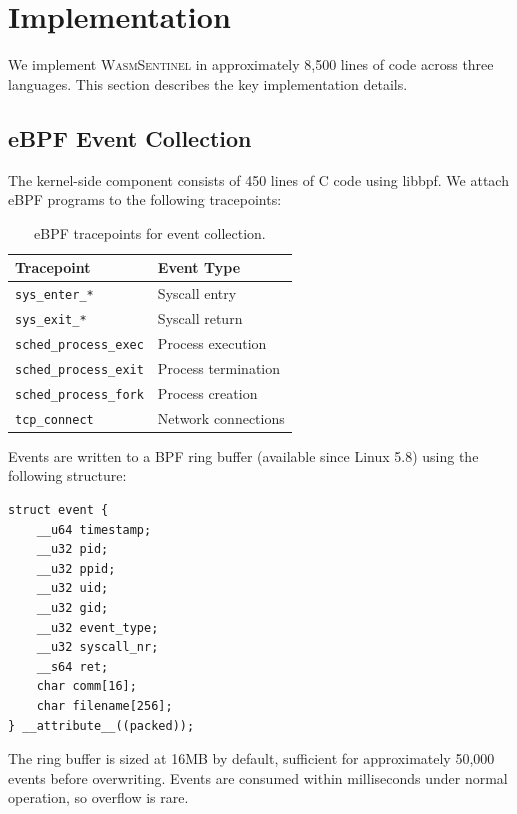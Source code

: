 
\section{Implementation}
\label{sec:implementation}

We implement \textsc{WasmSentinel} in approximately 8,500 lines of code across three languages.
This section describes the key implementation details.

\subsection{eBPF Event Collection}

The kernel-side component consists of 450 lines of C code using libbpf.
We attach eBPF programs to the following tracepoints:

\begin{table}[t]
\centering
\caption{eBPF tracepoints for event collection.}
\label{tab:tracepoints}
\begin{tabular}{ll}
\toprule
\textbf{Tracepoint} & \textbf{Event Type} \\
\midrule
\texttt{sys\_enter\_*} & Syscall entry \\
\texttt{sys\_exit\_*} & Syscall return \\
\texttt{sched\_process\_exec} & Process execution \\
\texttt{sched\_process\_exit} & Process termination \\
\texttt{sched\_process\_fork} & Process creation \\
\texttt{tcp\_connect} & Network connections \\
\bottomrule
\end{tabular}
\end{table}

Events are written to a BPF ring buffer (available since Linux 5.8) using the following structure:

\begin{lstlisting}[style=rust, caption={Kernel event structure (C).}, label=lst:event-struct]
struct event {
    __u64 timestamp;
    __u32 pid;
    __u32 ppid;
    __u32 uid;
    __u32 gid;
    __u32 event_type;
    __u32 syscall_nr;
    __s64 ret;
    char comm[16];
    char filename[256];
} __attribute__((packed));
\end{lstlisting}

The ring buffer is sized at 16MB by default, sufficient for approximately 50,000 events before overwriting.
Events are consumed within milliseconds under normal operation, so overflow is rare.

